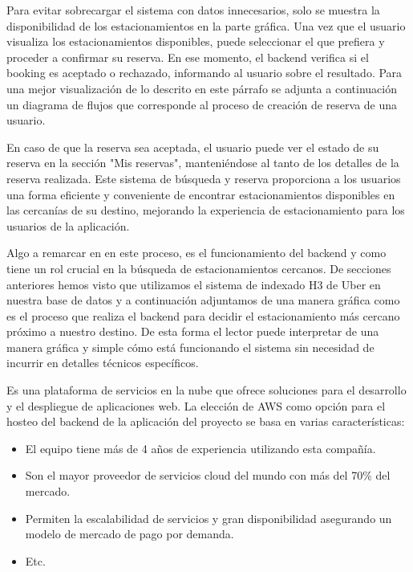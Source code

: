 Para evitar sobrecargar el sistema con datos innecesarios, solo se muestra la disponibilidad de los estacionamientos en la parte gráfica. Una vez que el usuario visualiza los estacionamientos disponibles, puede seleccionar el que prefiera y proceder a confirmar su reserva. En ese momento, el backend verifica si el booking es aceptado o rechazado, informando al usuario sobre el resultado. Para una mejor visualización de lo descrito en este párrafo se adjunta a continuación un diagrama de flujos que corresponde al proceso de creación de reserva de una usuario.


En caso de que la reserva sea aceptada, el usuario puede ver el estado de su reserva en la sección "Mis reservas", manteniéndose al tanto de los detalles de la reserva realizada. Este sistema de búsqueda y reserva proporciona a los usuarios una forma eficiente y conveniente de encontrar estacionamientos disponibles en las cercanías de su destino, mejorando la experiencia de estacionamiento para los usuarios de la aplicación.

Algo a remarcar en en este proceso, es el funcionamiento del backend y como tiene un rol crucial en la búsqueda de estacionamientos cercanos. De secciones anteriores hemos visto que utilizamos el sistema de indexado H3 de Uber en nuestra base de datos y a continuación adjuntamos de una manera gráfica como es el proceso que realiza el backend para decidir el estacionamiento más cercano próximo a nuestro destino. De esta forma el lector puede interpretar de una manera gráfica y simple cómo está funcionando el sistema sin necesidad de incurrir en detalles técnicos específicos.



Es una plataforma de servicios en la nube que ofrece soluciones para el desarrollo y el despliegue de aplicaciones web. La elección de AWS como opción para el hosteo del backend de la aplicación del proyecto se basa en varias características: 

\begin{itemize}
    \item El equipo tiene más de 4 años de experiencia utilizando esta compañía.
    \item Son el mayor proveedor de servicios cloud del mundo con más del 70\% del mercado.
    \item Permiten la escalabilidad de servicios y gran disponibilidad asegurando un modelo de mercado de pago por demanda.
    \item Etc.
\end{itemize}

